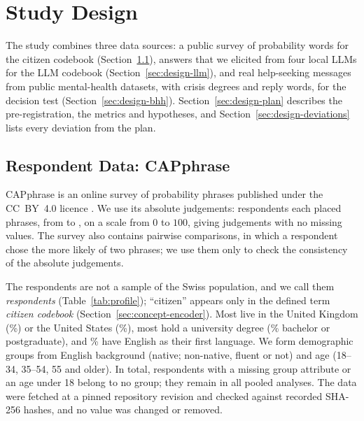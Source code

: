 \section{Study Design}
\label{sec:design}

The study combines three data sources: a public survey of probability words for the citizen codebook
(Section~\ref{sec:design-capphrase}), answers that we elicited from four local LLMs for the LLM codebook
(Section~\ref{sec:design-llm}), and real help-seeking messages from public mental-health datasets, with crisis degrees and
reply words, for the decision test
(Section~\ref{sec:design-bhh}).
Section~\ref{sec:design-plan} describes the pre-registration, the metrics and hypotheses, and
Section~\ref{sec:design-deviations} lists every deviation from the plan.

\subsection{Respondent Data: CAPphrase}
\label{sec:design-capphrase}

CAPphrase is an online survey of probability phrases published under the CC~BY~4.0 licence
\citep{kucharski2026capphrase}.
We use its absolute judgements: \WoneNRespondents{} respondents each placed \WoneNTerms{} phrases, from
 to , on a scale from $0$ to $100$, giving \WoneNJudgements{} judgements with
no missing values.
The survey also contains \WoneConsistencyNPairs{} pairwise comparisons, in which a respondent chose the more likely of two
phrases; we use them only to check the consistency of the absolute judgements.

The respondents are not a sample of the Swiss population, and we call them \emph{respondents}
(Table~\ref{tab:profile}); ``citizen'' appears only in the defined term \emph{citizen codebook} (Section~\ref{sec:concept-encoder}).
Most live in the United Kingdom (\WoneProfileCountryUnitedKingdomPct{}\%) or the United States
(\WoneProfileCountryUnitedStatesPct{}\%), most hold a university degree (\WoneProfileEducationDegreePct{}\% bachelor or
postgraduate), and \WoneProfileEnglishBackgroundEnglishIsMyFirstLanguagePct{}\% have English as their first language.
We form \WoneNGroups{} demographic groups from English background (native; non-native, fluent or not) and age
(18--34, 35--54, 55 and older).
In total, \WoneNotInGroups{} respondents with a missing group attribute or an age under 18 belong to no group; they
remain in all pooled analyses.
The data were fetched at a pinned repository revision and checked against recorded SHA-256 hashes, and no value was
changed or removed.

